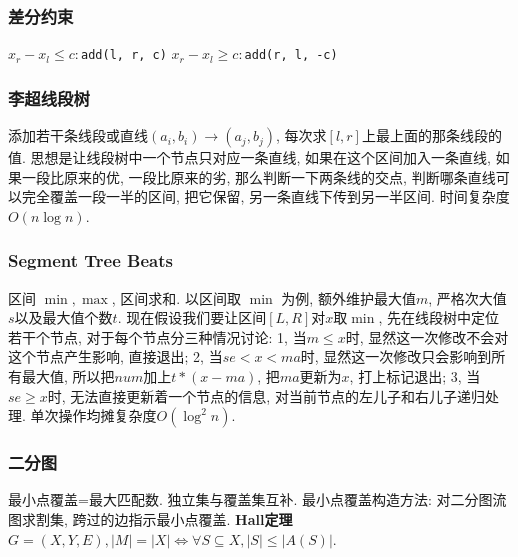 \subsubsection{差分约束}
$x_r - x_l \leq c:$\texttt{add(l, r, c)}
$x_r - x_l \geq c:$\texttt{add(r, l, -c)}

\subsubsection{李超线段树}
		添加若干条线段或直线$(a_i,b_i)\to (a_j,b_j)$, 每次求$[l,r]$上最上面的那条线段的值. 思想是让线段树中一个节点只对应一条直线, 如果在这个区间加入一条直线, 如果一段比原来的优, 一段比原来的劣, 那么判断一下两条线的交点, 判断哪条直线可以完全覆盖一段一半的区间, 把它保留, 另一条直线下传到另一半区间. 时间复杂度$O(n \log n)$. 
\subsubsection{Segment Tree Beats}
		区间 $\min, \max$, 区间求和. 以区间取 $\min$ 为例, 额外维护最大值$m$, 严格次大值$s$以及最大值个数$t$. 现在假设我们要让区间$[L,R]$对$x$取$\min$, 先在线段树中定位若干个节点, 对于每个节点分三种情况讨论: 1, 当$m\leq x$时, 显然这一次修改不会对这个节点产生影响, 直接退出; 2, 当$se<x<ma$时, 显然这一次修改只会影响到所有最大值, 所以把$num$加上$t*(x-ma)$, 把$ma$更新为$x$, 打上标记退出; 3, 当$se\geq x$时, 无法直接更新着一个节点的信息, 对当前节点的左儿子和右儿子递归处理. 单次操作均摊复杂度$O(\log^2n)$. 

\subsubsection{二分图}
		最小点覆盖=最大匹配数. 独立集与覆盖集互补. 最小点覆盖构造方法: 对二分图流图求割集, 跨过的边指示最小点覆盖.
		\textbf{Hall定理}$G=(X,Y,E), |M|=|X| \Leftrightarrow \forall S \subseteq X, |S| \leq |A(S)|$. 

